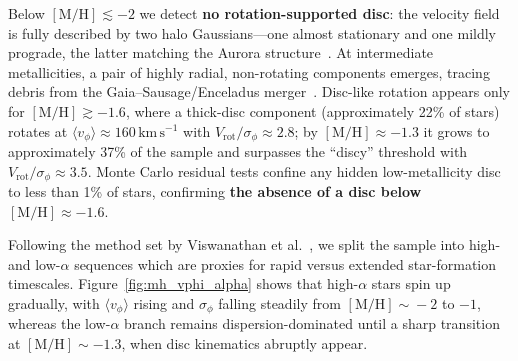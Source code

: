 \documentclass[a4paper,10pt]{article}
\begin{document}
\begin{multicols}{2}
Below $\mathrm{[M/H]}\lesssim -2$ we detect \textbf{no rotation-supported disc}: the 
velocity field is fully described by two halo Gaussians—one almost stationary and one 
mildly prograde, the latter matching the Aurora structure~\cite{Belokurov2022}. At 
intermediate metallicities, a pair of highly radial, non-rotating components emerges, 
tracing debris from the Gaia–Sausage/Enceladus merger~\cite{Belokurov2018}. Disc-like 
rotation appears only for $\mathrm{[M/H]}\gtrsim -1.6$, where a thick-disc component 
(approximately 22\% of stars) rotates at $\langle v_{\phi}\rangle \approx 
160\,\mathrm{km\,s^{-1}}$ with $V_{\mathrm{rot}}/\sigma_{\phi} \approx 2.8$; 
by $\mathrm{[M/H]}\approx -1.3$ it grows to approximately 37\% of the sample 
and surpasses the “discy” threshold with $V_{\mathrm{rot}}/\sigma_{\phi} \approx 3.5$. 
Monte Carlo residual tests confine any hidden low-metallicity disc to less than 1\% of stars, 
confirming \textbf{the absence of a disc below $\mathrm{[M/H]}\approx -1.6$}.



Following the method set by Viswanathan et al.~\cite{Vis2024}, we split the sample into high- and low-$\alpha$ sequences which are proxies for 
rapid versus extended star-formation timescales. Figure~\ref{fig:mh_vphi_alpha} shows that high-$\alpha$ stars 
spin up gradually, with $\langle v_\phi\rangle$ rising and $\sigma_\phi$ falling steadily from 
$\mathrm{[M/H]}\!\sim\!-2$ to $-1$, whereas the low-$\alpha$ branch remains dispersion-dominated until a 
sharp transition at $\mathrm{[M/H]}\sim-1.3$, when disc kinematics abruptly appear.  


\end{multicols}
\end{document}
